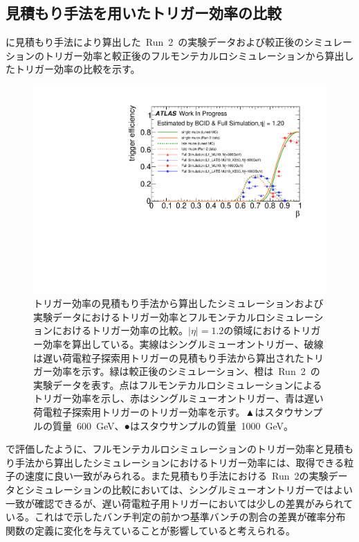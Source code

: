 \subsection{見積もり手法を用いたトリガー効率の比較}
に見積もり手法により算出した~Run~2~の実験データおよび較正後のシミュレーションのトリガー効率と較正後のフルモンテカルロシミュレーションから算出したトリガー効率の比較を示す。
\begin{figure}[tbp]
    \centering   
    \includegraphics[width=\textwidth,page=1]{img/rec/tunetune.pdf}
    \caption[トリガー効率の見積もり手法から算出したシミュレーションおよび実験データにおけるトリガー効率とフルモンテカルロシミュレーションにおけるトリガー効率の比較]{トリガー効率の見積もり手法から算出したシミュレーションおよび実験データにおけるトリガー効率とフルモンテカルロシミュレーションにおけるトリガー効率の比較。$|\eta|=1.2$の領域におけるトリガー効率を算出している。実線はシングルミューオントリガー、破線は遅い荷電粒子探索用トリガーの見積もり手法から算出されたトリガー効率を示す。緑は較正後のシミュレーション、橙は~Run~2~の実験データを表す。点はフルモンテカルロシミュレーションによるトリガー効率を示し、赤はシングルミューオントリガー、青は遅い荷電粒子探索用トリガーのトリガー効率を示す。▲はスタウサンプルの質量~600~GeV、●はスタウサンプルの質量~1000~GeV。}\label{fig:rectritune}
\end{figure}
で評価したように、フルモンテカルロシミュレーションのトリガー効率と見積もり手法から算出したシミュレーションにおけるトリガー効率には、取得できる粒子の速度に良い一致がみられる。また見積もり手法における~Run~2の実験データとシミュレーションの比較においては、シングルミューオントリガーではよい一致が確認できるが、遅い荷電粒子用トリガーにおいては少しの差異がみられている。これはで示したバンチ判定の前かつ基準バンチの割合の差異が確率分布関数の定義に変化を与えていることが影響していると考えられる。

